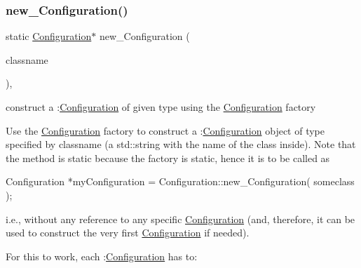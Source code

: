 \subsubsection{\texorpdfstring{new\+\_\+\+Configuration()}{new\_Configuration()}\hspace{0.1cm}{\footnotesize\ttfamily [1/2]}}
{\footnotesize\ttfamily static \mbox{\hyperlink{class_s_m_spp__di__unipi__it_1_1_configuration}{Configuration}}$\ast$ new\+\_\+\+Configuration (\begin{DoxyParamCaption}\item[{const std\+::string \&}]{classname }\end{DoxyParamCaption})\hspace{0.3cm}{\ttfamily [inline]}, {\ttfamily [static]}}



construct a \+:\mbox{\hyperlink{class_s_m_spp__di__unipi__it_1_1_configuration}{Configuration}} of given type using the \mbox{\hyperlink{class_s_m_spp__di__unipi__it_1_1_configuration}{Configuration}} factory 

Use the \mbox{\hyperlink{class_s_m_spp__di__unipi__it_1_1_configuration}{Configuration}} factory to construct a \+:\mbox{\hyperlink{class_s_m_spp__di__unipi__it_1_1_configuration}{Configuration}} object of type specified by classname (a std\+::string with the name of the class inside). Note that the method is static because the factory is static, hence it is to be called as \begin{DoxyVerb}Configuration *myConfiguration =
                        Configuration::new_Configuration( someclass );
\end{DoxyVerb}


i.\+e., without any reference to any specific \mbox{\hyperlink{class_s_m_spp__di__unipi__it_1_1_configuration}{Configuration}} (and, therefore, it can be used to construct the very first \mbox{\hyperlink{class_s_m_spp__di__unipi__it_1_1_configuration}{Configuration}} if needed).

For this to work, each \+:\mbox{\hyperlink{class_s_m_spp__di__unipi__it_1_1_configuration}{Configuration}} has to\+:


